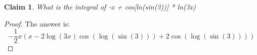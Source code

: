 \documentclass{article}
\newtheorem{theorem}{Claim}
\begin{document}
\begin{theorem}
What is the integral of -x + cos[ln(sin(3))] * ln(3x)
\end{theorem}

\begin{proof}
The answer is:
\[
-\frac{1}{2} x (x-2 \log (3 x) \cos (\log (\sin (3)))+2 \cos (\log (\sin (3))))
\]
\end{proof}
\end{document}
